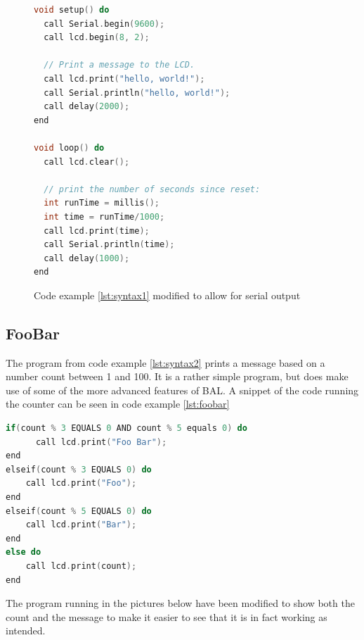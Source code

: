 \begin{figure}[h!]
\begin{lstlisting}[caption=Hello World with serial output, language={C++},label=lst:serial]
void setup() do
  call Serial.begin(9600);
  call lcd.begin(8, 2);

  // Print a message to the LCD.
  call lcd.print("hello, world!");
  call Serial.println("hello, world!");
  call delay(2000);
end

void loop() do
  call lcd.clear();

  // print the number of seconds since reset:
  int runTime = millis();
  int time = runTime/1000;
  call lcd.print(time);
  call Serial.println(time);
  call delay(1000);
end
\end{lstlisting}
\caption{Code example \ref{lst:syntax1} modified to allow for serial output}
\end{figure}

\subsection*{FooBar}
The program from code example \ref{lst:syntax2} prints a message based on a number count between 1 and 100. It is a rather simple program, but does make use of some of the more advanced features of BAL. A snippet of the code running the counter can be seen in code example \ref{lst:foobar}
\begin{lstlisting}[caption=Hello World with serial output,firstnumber=26, language={C++},label=lst:foobar]
if(count % 3 EQUALS 0 AND count % 5 equals 0) do
      call lcd.print("Foo Bar"); 
end
elseif(count % 3 EQUALS 0) do
    call lcd.print("Foo");
end
elseif(count % 5 EQUALS 0) do
    call lcd.print("Bar");
end
else do
    call lcd.print(count);
end
\end{lstlisting}

The program running in the pictures below have been modified to show both the count and the message to make it easier to see that it is in fact working as intended.

